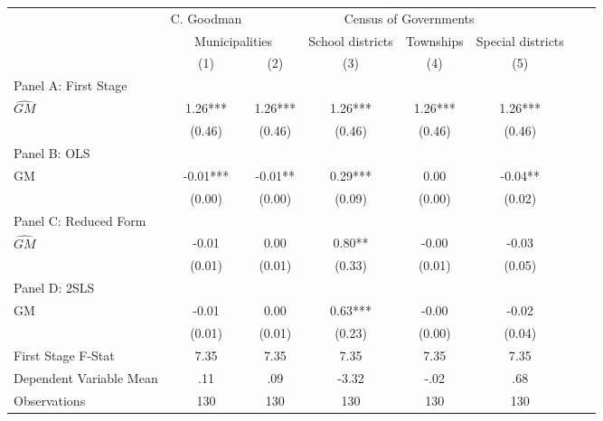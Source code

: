 \begin{tabular}{l*{7}{c}} \toprule
&\multicolumn{1}{c}{C. Goodman}&\multicolumn{4}{c}{Census of Governments}\\\cmidrule(lr){2-2}\cmidrule(lr){3-6}
&\multicolumn{2}{c}{Municipalities}&\multicolumn{1}{c}{School districts}&\multicolumn{1}{c}{Townships}&\multicolumn{1}{c}{Special districts}\\\cmidrule(lr){2-3}\cmidrule(lr){4-6}
&\multicolumn{1}{c}{(1)}&\multicolumn{1}{c}{(2)}&\multicolumn{1}{c}{(3)}&\multicolumn{1}{c}{(4)}&\multicolumn{1}{c}{(5)}\\
\cmidrule(lr){1-6}
\multicolumn{5}{l}{Panel A: First Stage}\\
\cmidrule(lr){1-6}
$\widehat{GM}$  &     1.26***&     1.26***&     1.26***&     1.26***&     1.26***\\
                &   (0.46)   &   (0.46)   &   (0.46)   &   (0.46)   &   (0.46)   \\
\cmidrule(lr){1-6}
\multicolumn{5}{l}{Panel B: OLS}\\
\cmidrule(lr){1-6}
GM              &    -0.01***&    -0.01** &     0.29***&     0.00   &    -0.04** \\
                &   (0.00)   &   (0.00)   &   (0.09)   &   (0.00)   &   (0.02)   \\
\cmidrule(lr){1-6}
\multicolumn{5}{l}{Panel C: Reduced Form}\\
\cmidrule(lr){1-6}
$\widehat{GM}$  &    -0.01   &     0.00   &     0.80** &    -0.00   &    -0.03   \\
                &   (0.01)   &   (0.01)   &   (0.33)   &   (0.01)   &   (0.05)   \\
\cmidrule(lr){1-6}
\multicolumn{5}{l}{Panel D: 2SLS}\\
\cmidrule(lr){1-6}
GM              &    -0.01   &     0.00   &     0.63***&    -0.00   &    -0.02   \\
                &   (0.01)   &   (0.01)   &   (0.23)   &   (0.00)   &   (0.04)   \\
\midrule
First Stage F-Stat&     7.35   &     7.35   &     7.35   &     7.35   &     7.35   \\
Dependent Variable Mean&      .11   &      .09   &    -3.32   &     -.02   &      .68   \\
Observations    &      130   &      130   &      130   &      130   &      130   \\
       \bottomrule \end{tabular}
